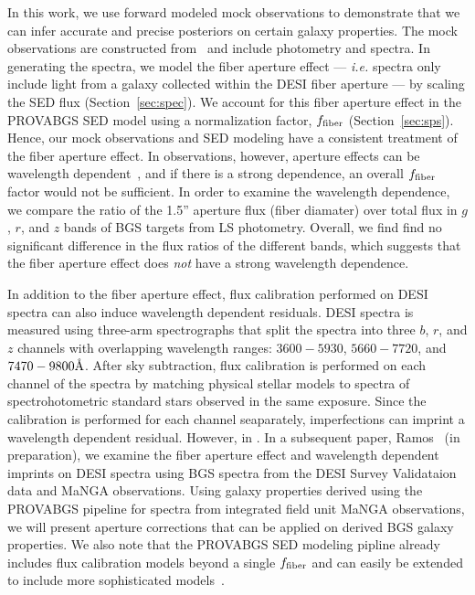 
In this work, we use forward modeled mock observations to demonstrate that we
can infer accurate and precise posteriors on certain galaxy properties.
The mock observations are constructed from \lgal~and include photometry and
spectra. 
In generating the spectra, we model the fiber aperture effect --- \emph{i.e.}
spectra only include light from a galaxy collected within the DESI fiber
aperture --- by scaling the SED flux (Section~\ref{sec:spec}).
We account for this fiber aperture effect in the {\sc PROVABGS} SED model using 
a normalization factor, $f_{\rm fiber}$ (Section~\ref{sec:sps}). 
Hence, our mock observations and SED modeling have a consistent treatment of
the fiber aperture effect. 
In observations, however, aperture effects can be wavelength
dependent~\citep{gerssen2012, richards2016}, and if there is a strong
dependence, an overall $f_{\rm fiber}$ factor would not be sufficient.
In order to examine the wavelength dependence, we compare the ratio of the
1.5'' aperture flux (fiber diamater) over total flux in $g$, $r$, and $z$ bands
of BGS targets from LS photometry.
Overall, we find find no significant difference in the flux ratios of the different
bands, which suggests that the fiber aperture effect does \emph{not} have a strong
wavelength dependence. 

In addition to the fiber aperture effect, flux calibration performed on DESI
spectra can also induce wavelength dependent residuals. 
DESI spectra is measured using three-arm spectrographs that split the spectra
into three $b$, $r$, and $z$ channels with overlapping wavelength ranges: 
$3600 - 5930$, $5660 - 7720$, and $7470 - 9800 \AA$.  
After sky subtraction, flux calibration is performed on each channel of the
spectra by matching physical stellar models to spectra of spectrohotometric
standard stars observed in the same exposure. 
Since the calibration is performed for each channel seaparately, imperfections
can imprint a wavelength dependent residual. 
However, in .
In a subsequent paper, Ramos \etal~(in preparation), we examine the fiber
aperture effect and wavelength dependent imprints on DESI spectra using BGS
spectra from the DESI Survey Validataion data and MaNGA observations. 
Using galaxy properties derived using the {\sc PROVABGS} pipeline for spectra
from integrated field unit MaNGA observations, we will present aperture
corrections that can be applied on derived BGS galaxy properties. 
We also note that the {\sc PROVABGS} SED modeling pipline already includes flux
calibration models beyond a single $f_{\rm fiber}$ and can easily be extended
to include more sophisticated models~\citep[\emph{e.g.} Chebyschev
polynomial][]{carnall2017, tacchella2021}. 

